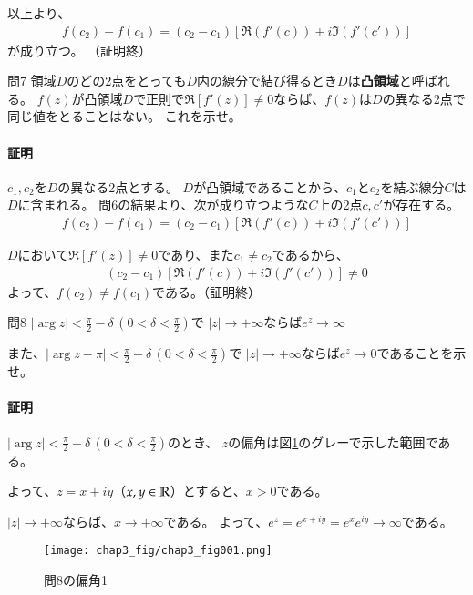 以上より、
\begin{align*}
    f(c_2)-f(c_1)=(c_2-c_1)[\Re(f'(c))+i\Im(f'(c'))]
\end{align*}
が成り立つ。
（証明終）

\begin{mysimplebox}{問7}
    領域$D$のどの2点をとっても$D$内の線分で結び得るとき$D$は\textbf{凸領域}と呼ばれる。
    $f(z)$が凸領域$D$で正則で$\Re[f'(z)]\neq0$ならば、$f(z)$は$D$の異なる2点で同じ値をとることはない。
    これを示せ。
\end{mysimplebox}
\paragraph{証明}
$c_1,c_2$を$D$の異なる2点とする。
$D$が凸領域であることから、$c_1$と$c_2$を結ぶ線分$C$は$D$に含まれる。
問6の結果より、次が成り立つような$C$上の2点$c,c'$が存在する。
\begin{align*}
    f(c_2)-f(c_1)=(c_2-c_1)[\Re(f'(c))+i\Im(f'(c'))]
\end{align*}

$D$において$\Re[f'(z)]\neq0$であり、また$c_1\neq c_2$であるから、
\begin{align*}
    (c_2-c_1)[\Re(f'(c))+i\Im(f'(c'))]\neq0
\end{align*}
よって、$f(c_2)\neq f(c_1)$である。（証明終）

\begin{mysimplebox}{問8}
    $|\arg z|<\frac{\pi}{2}-\delta\,(0<\delta<\frac{\pi}{2})$で
    $|z|\longrightarrow+\infty$ならば$e^z\longrightarrow\infty$

    また、$|\arg z-\pi|<\frac{\pi}{2}-\delta\,(0<\delta<\frac{\pi}{2})$で
    $|z|\longrightarrow+\infty$ならば$e^z\longrightarrow0$であることを示せ。
\end{mysimplebox}
\paragraph{証明}
$|\arg z|<\frac{\pi}{2}-\delta\,(0<\delta<\frac{\pi}{2})$のとき、
$z$の偏角は図\ref{fig:chap3prob8-1}のグレーで示した範囲である。

よって、$z=x+iy$（$x,y\in\mathbb{R}$）とすると、$x>0$である。

$|z|\longrightarrow+\infty$ならば、$x\longrightarrow+\infty$である。
よって、$e^z=e^{x+iy}=e^xe^{iy}\longrightarrow\infty$である。
\begin{figure}[h]
    \centering
    \texttt{[image: chap3\_fig/chap3\_fig001.png]}
    \caption{問8の偏角1}
    \label{fig:chap3prob8-1}
\end{figure}

